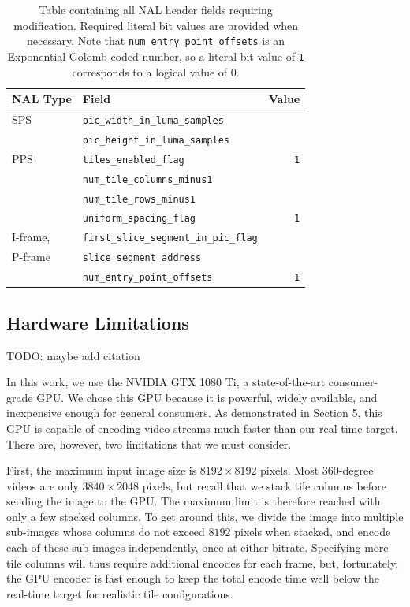 \setcounter{figure}{1}
\begin{table}
	\begin{tabularx}{\columnwidth}{llr}
		\toprule
		NAL Type & Field & Value \\
		\midrule
		SPS & \texttt{pic\_width\_in\_luma\_samples} & \\
		 & \texttt{pic\_height\_in\_luma\_samples} &  \\
		\midrule
		PPS & \texttt{tiles\_enabled\_flag} & \texttt{1}  \\
		& \texttt{num\_tile\_columns\_minus1} &  \\ 
		& \texttt{num\_tile\_rows\_minus1} &  \\
		& \texttt{uniform\_spacing\_flag} & \texttt{1}  \\
		\midrule
		I-frame, & \texttt{first\_slice\_segment\_in\_pic\_flag} & \\
		P-frame & \texttt{slice\_segment\_address} &  \\
		& \texttt{num\_entry\_point\_offsets} & \texttt{1}  \\
		\bottomrule
	\end{tabularx}
	\caption{Table containing all NAL header fields requiring modification. Required literal bit values are provided when necessary. Note that \texttt{num\_entry\_point\_offsets} is an Exponential Golomb-coded number, so a literal bit value of \texttt{1} corresponds to a logical value of 0.}
	\label{tab:stitch}
\end{table}
\renewcommand{\figurename}{Fig.}
\setcounter{figure}{1}

\subsection{Hardware Limitations}

TODO: maybe add citation

In this work, we use the NVIDIA GTX 1080 Ti, a state-of-the-art consumer-grade GPU. We chose this GPU because it is powerful, widely available, and inexpensive enough for general consumers. As demonstrated in Section 5, this GPU is capable of encoding video streams much faster than our real-time target. There are, however, two limitations that we must consider.

First, the maximum input image size is $8192\times8192$ pixels. Most 360-degree videos are only $3840\times2048$ pixels, but recall that we stack tile columns before sending the image to the GPU. The maximum limit is therefore reached with only a few stacked columns. To get around this, we divide the image into multiple sub-images whose columns do not exceed $8192$ pixels when stacked, and encode each of these sub-images independently, once at either bitrate. Specifying more tile columns will thus require additional encodes for each frame, but, fortunately, the GPU encoder is fast enough to keep the total encode time well below the real-time target for realistic tile configurations.

